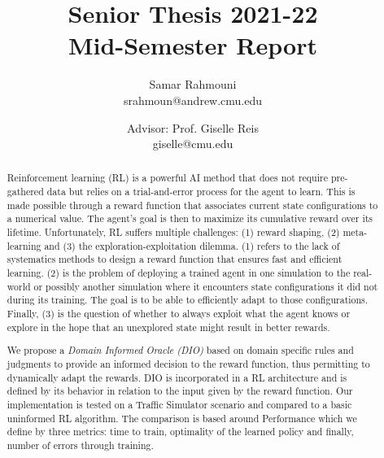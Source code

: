 \documentclass[a4paper,11pt]{article}
\author{%
  \begin{minipage}[t]{0.47\textwidth}
    \centering
    Samar Rahmouni \\ srahmoun@andrew.cmu.edu
  \end{minipage}
  \and
  \begin{minipage}[t]{0.45\textwidth}
    \centering
    Advisor: Prof. Giselle Reis \\ giselle@cmu.edu
  \end{minipage}%
  \vspace*{2ex}
}
\date{}
\title{{\Large\sc Senior Thesis 2021-22\\[2ex]}{\LARGE\bf Mid-Semester Report\vspace*{3ex}}}
\theoremstyle{definition}
\begin{document}
\maketitle 

\begin{abstract} Reinforcement learning (RL) is a powerful AI method that does not require pre-gathered data but 
  relies on a trial-and-error process for the agent to learn. This is made possible through a reward function that associates 
  current state configurations to a numerical value. The agent's goal is then to maximize its cumulative reward over its lifetime. 
  Unfortunately, RL suffers multiple challenges: (1) reward shaping, (2) meta-learning and (3) the exploration-exploitation dilemma. 
  (1) refers to the lack of systematics methods to design a reward function that ensures fast and efficient learning. (2) is the problem of 
  deploying a trained agent in one simulation to the real-world or possibly another simulation where it encounters 
  state configurations it did not during its training. The goal is to be able to efficiently adapt to those configurations. Finally, (3) 
  is the question of whether to always exploit what the agent knows or explore in the hope that an unexplored state 
  might result in better rewards. 

  \medskip 

  We propose a \emph{Domain Informed Oracle (DIO)} based on domain specific rules and judgments to provide 
  an informed decision to the reward function, thus permitting to dynamically adapt the rewards. DIO is incorporated 
  in a RL architecture and is defined by its behavior in relation to the input given by the reward function. 
  Our implementation is tested on a Traffic Simulator scenario and compared to a basic uninformed RL algorithm. The comparison 
  is based around Performance which we define by three metrics: time to train, optimality of the learned policy and finally, number of errors through training. 
  
\end{abstract}
\end{document}
